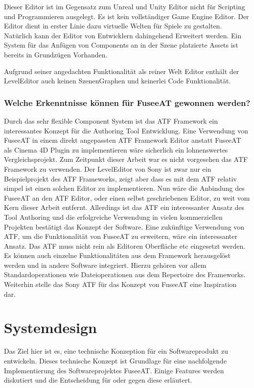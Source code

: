 \documentclass[pagesize, paper=a4, fontsize=12pt, titlepage=true, headings=small, headnosepline, abstractoff, liststotoc, nochapterprefix, plainheadsepline, twoside]{scrreprt}
\begin{document}
Dieser Editor ist im Gegensatz zum Unreal und Unity Editor nicht für Scripting und Programmieren ausgelegt. Es ist kein vollständiger Game Engine Editor. Der Editor dient in erster Linie dazu virtuelle Welten für Spiele zu gestalten. Natürlich kann der Editor von Entwicklern dahingehend Erweitert werden. Ein System für das Anfügen von Components an in der Szene platzierte Assets ist bereits in Grundzügen Vorhanden.

Aufgrund seiner angedachten Funktionalität als reiner Welt Editor enthält der LevelEditor auch keinen SzenenGraphen und keinerlei Code Funktionalität.

\subsubsection{Welche Erkenntnisse können für FuseeAT gewonnen werden?}
Durch das sehr flexible Component System ist das ATF Framework ein interessantes Konzept für die Authoring Tool Entwicklung. Eine Verwendung von FuseeAT in einem direkt angepassten ATF Framework Editor anstatt FuseeAT als Cinema 4D Plugin zu implementieren wäre sicherlich ein lohnenswertes Vergleichsprojekt. Zum Zeitpunkt dieser Arbeit war es nicht vorgesehen das ATF Framework zu verwenden. Der LevelEditor von Sony ist zwar nur ein Beispielprojekt des ATF Frameworks, zeigt aber dass es mit dem ATF relativ simpel ist einen solchen Editor zu implementieren. Nun wäre die Anbindung des FuseeAT an den ATF Editor, oder einen selbst geschriebenen Editor,  zu weit vom Kern dieser Arbeit entfernt. Allerdings ist das ATF ein interessanter Ansatz des Tool Authoring und die erfolgreiche Verwendung in vielen kommerziellen Projekten bestätigt das Konzept der Software. Eine zukünftige Verwendung von ATF, um die Funktionalität von FuseeAT zu erweitern, wäre ein interessanter Ansatz. Das ATF muss nicht rein als Editoren Oberfläche etc eingesetzt werden. Es können auch einzelne Funktionalitäten aus dem Framework herausgelöst werden und in andere Software integriert. Hierzu gehören vor allem Standardoperationen wie Dateioperationen aus dem Repertoire des Frameworks. Weiterhin stelle das Sony ATF für das Konzept von FuseeAT eine Inspiration dar.

\section{Systemdesign}
Das Ziel hier ist es, eine technische Konzeption für ein Softwareprodukt zu entwickeln. Dieses technische Konzept ist Grundlage für eine nachfolgende Implementierung des Softwareprojektes FuseeAT. Einige Features werden diskutiert und die Entscheidung für oder gegen diese erläutert.
\end{document}
